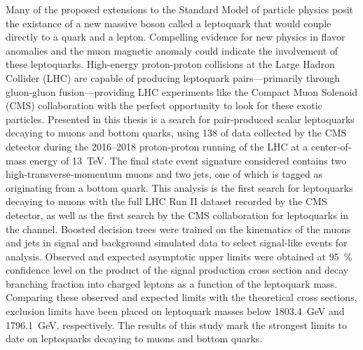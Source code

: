 


Many of the proposed extensions to the Standard Model of particle physics posit the existance of a new massive boson called a leptoquark that would couple directly to a quark and a lepton. Compelling evidence for new physics in flavor anomalies and the muon magnetic anomaly could indicate the involvement of these leptoquarks. High-energy proton-proton collisions at the Large Hadron Collider (LHC) are capable of producing leptoquark pairs---primarily through gluon-gluon fusion---providing LHC experiments like the Compact Muon Solenoid (CMS) collaboration with the perfect opportunity to look for these exotic particles. Presented in this thesis is a search for pair-produced scalar leptoquarks decaying to muons and bottom quarks, using \SI{138}{\invfb} of data collected by the CMS detector during the 2016--2018 proton-proton running of the LHC at a center-of-mass energy of \SI{13}{\TeV}. The final state event signature considered contains two high-transverse-momentum muons and two jets, one of which is tagged as originating from a bottom quark. This analysis is the first search for leptoquarks decaying to muons with the full LHC Run II dataset recorded by the CMS detector, as well as the first search by the CMS collaboration for leptoquarks in the  channel. Boosted decision trees were trained on the kinematics of the muons and jets in signal and background simulated data to select signal-like events for analysis. Observed and expected asymptotic upper limits were obtained at \SI{95}{\%} confidence level on the product of the signal production cross section and decay branching fraction into charged leptons as a function of the leptoquark mass. Comparing these observed and expected limits with the theoretical cross sections, exclusion limits have been placed on leptoquark masses below \SI{1803.4}{\GeV} and \SI{1796.1}{\GeV}, respectively. The results of this study mark the strongest limits to date on leptoquarks decaying to muons and bottom quarks.